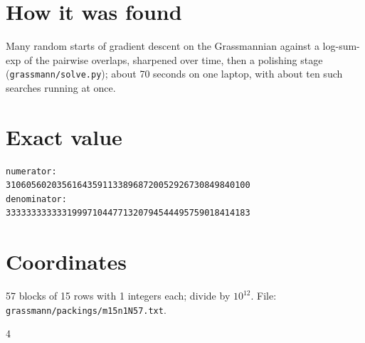 \documentclass[11pt,a4paper]{article}
\begin{document}
\section{How it was found}
Many random starts of gradient descent on the Grassmannian against a log-sum-exp of the pairwise overlaps, sharpened over time, then a polishing stage (\texttt{grassmann/solve.py}); about 70 seconds on one laptop, with about ten such searches running at once.


\appendix
\section{Exact value}
{\small
\begin{verbatim}
numerator:
310605602035616435911338968720052926730849840100
denominator:
333333333333199971044771320794544495759018414183
\end{verbatim}}

\section{Coordinates}
57 blocks of 15 rows with 1 integers each; divide by $10^{12}$. File: \texttt{grassmann/packings/m15n1N57.txt}.
{\tiny
\begin{multicols}{4}
\end{multicols}}
\end{document}
